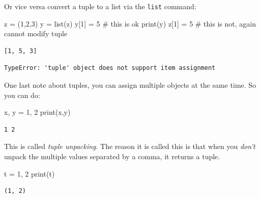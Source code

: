\documentclass[
  letterpaper,
]{scrbook}
\newenvironment{Shaded}{\begin{snugshade}}{\end{snugshade}}
\newcommand{\BuiltInTok}[1]{\textcolor[rgb]{0.00,0.23,0.31}{#1}}
\newcommand{\CommentTok}[1]{\textcolor[rgb]{0.37,0.37,0.37}{#1}}
\newcommand{\DecValTok}[1]{\textcolor[rgb]{0.68,0.00,0.00}{#1}}
\newcommand{\NormalTok}[1]{\textcolor[rgb]{0.00,0.23,0.31}{#1}}
\newcommand{\OperatorTok}[1]{\textcolor[rgb]{0.37,0.37,0.37}{#1}}
\begin{document}
Or vice versa convert a tuple to a list via the \texttt{list} command:

\begin{Shaded}
\begin{Highlighting}[]
\NormalTok{z }\OperatorTok{=}\NormalTok{ (}\DecValTok{1}\NormalTok{,}\DecValTok{2}\NormalTok{,}\DecValTok{3}\NormalTok{)}
\NormalTok{y }\OperatorTok{=} \BuiltInTok{list}\NormalTok{(z)}
\NormalTok{y[}\DecValTok{1}\NormalTok{] }\OperatorTok{=} \DecValTok{5} \CommentTok{\# this is ok}
\BuiltInTok{print}\NormalTok{(y)}
\NormalTok{z[}\DecValTok{1}\NormalTok{] }\OperatorTok{=} \DecValTok{5} \CommentTok{\# this is not, again cannot modify tuple}
\end{Highlighting}
\end{Shaded}

\begin{verbatim}
[1, 5, 3]
\end{verbatim}

\begin{verbatim}
TypeError: 'tuple' object does not support item assignment
\end{verbatim}

One last note about tuples, you can assign multiple objects at the same
time. So you can do:

\begin{Shaded}
\begin{Highlighting}[]
\NormalTok{x, y }\OperatorTok{=} \DecValTok{1}\NormalTok{, }\DecValTok{2}
\BuiltInTok{print}\NormalTok{(x,y)}
\end{Highlighting}
\end{Shaded}

\begin{verbatim}
1 2
\end{verbatim}

This is called \emph{tuple unpacking}. The reason it is called this is
that when you \emph{don't} unpack the multiple values separated by a
comma, it returns a tuple.

\begin{Shaded}
\begin{Highlighting}[]
\NormalTok{t }\OperatorTok{=} \DecValTok{1}\NormalTok{, }\DecValTok{2}
\BuiltInTok{print}\NormalTok{(t)}
\end{Highlighting}
\end{Shaded}

\begin{verbatim}
(1, 2)
\end{verbatim}
\end{document}
